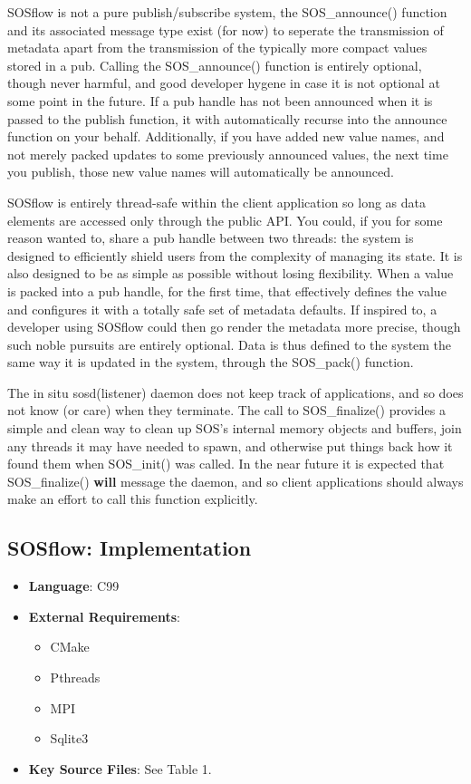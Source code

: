 SOSflow is not a pure publish/subscribe system, the SOS\_announce()
function and its associated message type exist (for now) to seperate the
transmission of metadata apart from the transmission of the typically
more compact values stored in a pub.  Calling the SOS\_announce()
function is entirely optional, though never harmful, and good
developer hygene in case it is not optional at some point in the
future. If a pub handle has not been announced when it is passed to
the publish function, it with automatically recurse into the announce
function on your behalf.  Additionally, if you have added new value
names, and not merely packed updates to some previously announced
values, the next time you publish, those new value names will
automatically be announced.

SOSflow is entirely thread-safe within the client application so long
as data elements are accessed only through the public API. You could,
if you for some reason wanted to, share a pub handle between two
threads: the system is designed to efficiently shield users from the
complexity of managing its state.  It is also designed to be as simple
as possible without losing flexibility. When a value is packed into a
pub handle, for the first time, that effectively defines the value and
configures it with a totally safe set of metadata defaults. If inspired
to, a developer using SOSflow could then go render the metadata more
precise, though such noble pursuits are entirely optional. Data is
thus defined to the system the same way it is updated in the system,
through the SOS\_pack() function.

The in situ sosd(listener) daemon does not keep track of applications,
and so does not know (or care) when they terminate. The call to SOS\_finalize()
provides a simple and clean way to clean up SOS's internal memory objects
and buffers, join any threads it may have needed to spawn, and otherwise
put things back how it found them when SOS\_init() was called. In the
near future it is expected that SOS\_finalize() \textbf{will} message the
daemon, and so client applications should always make an effort to call
this function explicitly.

\subsection{SOSflow: Implementation}
\begin{itemize}
  \item \textbf{Language}: C99
   \item \textbf{External Requirements}:
   \begin{itemize}
    \item CMake
    \item Pthreads
    \item MPI
    \item Sqlite3
    \end{itemize}
  \item \textbf{Key Source Files}: See Table 1.
\end{itemize}

